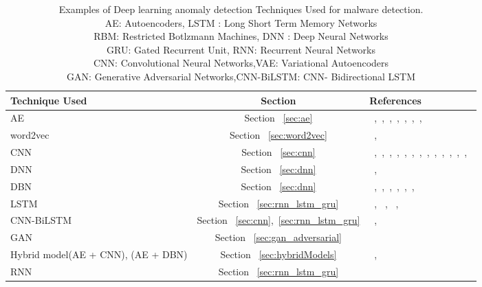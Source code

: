 \begin{table*}
  \begin{center}
   \caption{Examples of Deep learning anomaly detection Techniques Used for malware detection.
             \\AE: Autoencoders, LSTM : Long Short Term Memory Networks
             \\RBM: Restricted Botlzmann Machines, DNN : Deep Neural Networks
             \\GRU: Gated Recurrent Unit, RNN: Recurrent Neural Networks
             \\CNN: Convolutional Neural Networks,VAE: Variational Autoencoders
             \\GAN: Generative Adversarial Networks,CNN-BiLSTM: CNN- Bidirectional LSTM}
    \label{tab:malwareDetect}
    \begin{tabular}{l|c|p{7cm}}
      \textbf{Technique Used} & \textbf{Section} & \textbf{References}\\
      \hline
      AE &  Section ~\ref{sec:ae}  & ~\cite{yousefi2017autoencoder},~\cite{hardy2016dl4md},~\cite{yousefi2017autoencoder},~\cite{de2018malware},~\cite{sewak2018investigation},~\cite{kebede2017classification},~\cite{de2018malware},~\cite{david2015deepsign}\\\hline
      word2vec & Section ~\ref{sec:word2vec} &  ~\cite{cakir2018malware},~\cite{silva2018improving}\\\hline
      CNN & Section ~\ref{sec:cnn} &  ~\cite{kolosnjaji2018adversarial},~\cite{suciu2018exploring},~\cite{srisakaokul2018muldef},~\cite{srisakaokul2018muldef},~\cite{king2018artificial},~\cite{huang2017r2},~\cite{guo2017malware},~\cite{abdelsalam2018malware},~\cite{raff2017malware},~\cite{karbab2018maldozer},~\cite{martinelli2017evaluating},~\cite{mclaughlin2017deep},~\cite{gibert2018using},~\cite{kolosnjaji2017empowering}\\\hline
      DNN & Section ~\ref{sec:dnn} &  ~\cite{rosenberg2018end},~\cite{wang2017adversary}\\\hline
      DBN & Section ~\ref{sec:dnn} &  ~\cite{david2015deepsign},~\cite{yang2016application},~\cite{ding2016application},~\cite{yuxin2017malware},~\cite{selvaganapathy2018deep},~\cite{yuxin2017malware},~\cite{hou2017deep}\\\hline
      LSTM & Section ~\ref{sec:rnn_lstm_gru} &  ~\cite{tobiyama2016malware}, ~\cite{hu2017black},~\cite{tobiyama2018method} ,~\cite{passalislong} \\\hline
      CNN-BiLSTM& Section ~\ref{sec:cnn},~\ref{sec:rnn_lstm_gru} &  ~\cite{le2018deep},~\cite{wang2017adversary} \\\hline
      GAN& Section ~\ref{sec:gan_adversarial} &  ~\cite{kim2018zero} \\\hline
      Hybrid model(AE + CNN), (AE + DBN) & Section ~\ref{sec:hybridModels} &  ~\cite{wang2018effective},~\cite{li2015hybrid} \\\hline
      RNN & Section ~\ref{sec:rnn_lstm_gru} &  ~\cite{haddadpajouh2018deep} \\\hline

    \end{tabular}
  \end{center}
\end{table*}
